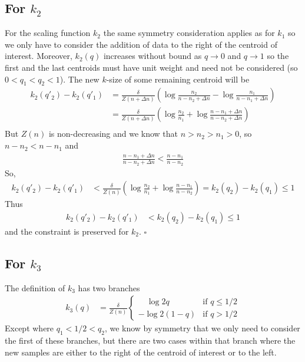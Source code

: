 \documentclass[11pt]{amsart}
\begin{document}
\subsection{For $k_2$}
For the scaling function $k_2$ the same symmetry consideration applies as for $k_1$ so we only have to consider the addition of data to the right of the centroid of interest. Moreover, $k_2(q)$ increases without bound as $q \rightarrow 0$ and $q \rightarrow 1$ so the first and the last centroids must have unit weight and  need not be considered (so $0 < q_1<q_2<1$). The new $k$-size of some remaining centroid will be
\begin{align*}
k_2(q'_2)-k_2(q'_1)&= \frac \delta {Z(n+\Delta n)} \left( \log \frac {n_2} {n-n_2+\Delta n}-\log \frac {n_1} {n-n_1+\Delta n} \right) \\
&= \frac \delta {Z(n+\Delta n)} \left( \log \frac {n_2} {n_1} + \log \frac  {n-n_1+\Delta n}{n-n_2+\Delta n} \right) \\
\end{align*}
But $Z(n)$ is non-decreasing and we know that $n>n_2 > n_1 > 0$, so $n-n_2 < n-n_1$ and
\begin{align*}
\frac  {n-n_1+\Delta n}{n-n_2+\Delta n} <  \frac  {n-n_1}{n-n_2}
\end{align*}
So,
\begin{align*}
k_2(q'_2)-k_2(q'_1) &< \frac \delta {Z(n)} \left( \log \frac {n_2} {n_1} + \log \frac  {n-n_1}{n-n_2} \right) =k_2(q_2)-k_2(q_1) \le 1
\end{align*}
Thus
\begin{align*}
k_2(q'_2)-k_2(q'_1) &< k_2(q_2)-k_2(q_1) \le 1
\end{align*}
and the constraint is preserved for $k_2$.
$\square$
\subsection{For $k_3$}
The definition of $k_3$ has two branches
\begin{align*}
k_3(q) &= \frac \delta {Z(n)}\begin{cases}
\quad \log 2q & \text{if  } q \le 1/2 \\
- \log 2(1-q) & \text{if  } q > 1/2
\end{cases}
\end{align*}
Except where $q_1<1/2<q_2$, we know by symmetry that we only need to consider the first of these branches, but there are two cases within that branch where the new samples are either to the right of the centroid of interest or to the left.
\end{document}

